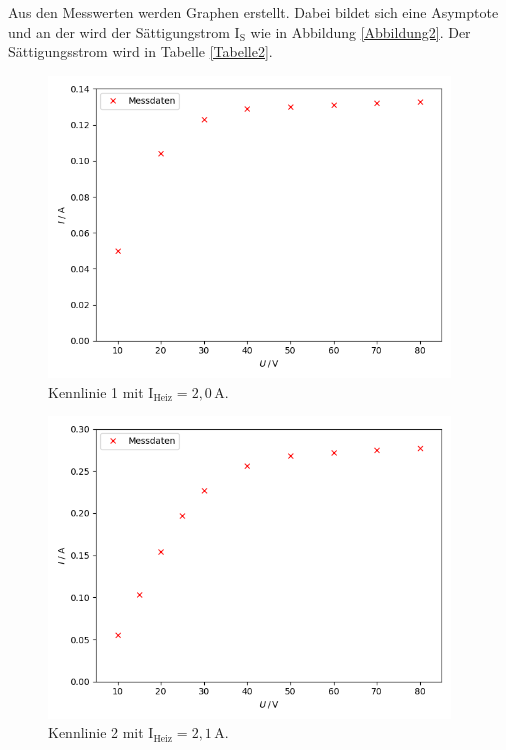 \begin{flushleft}
    Aus den Messwerten werden Graphen erstellt. 
    Dabei bildet sich eine Asymptote und an der wird der Sättigungstrom $\text{I}_{\text{S}}$ wie in Abbildung \ref{Abbildung2}.
    Der Sättigungsstrom wird in Tabelle \ref{Tabelle2}.
\end{flushleft}

\begin{figure}[H]
    \centering
    \includegraphics[height=80mm]{bilder/K1.png}
    \caption{Kennlinie 1 mit $\text{I}_{\text{Heiz}} = 2,0\,\unit{\ampere} $. \label{Abbildung6} }
\end{figure}

\begin{figure}[H]
    \centering
    \includegraphics[height=80mm]{bilder/K2.png}
    \caption{Kennlinie 2 mit $\text{I}_{\text{Heiz}} = 2,1\,\unit{\ampere} $.\label{Abbildung7} }
\end{figure}

